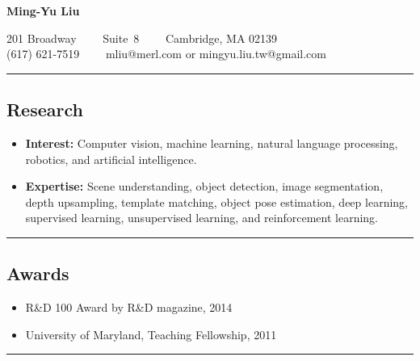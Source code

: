 \documentclass[10pt,letterpaper]{article}
\begin{document}
\begin{center}
{\LARGE \textbf{Ming-Yu Liu}}

201 Broadway\ \ \textbullet
\ \ Suite\ 8\ \ \textbullet
\ \ Cambridge, MA 02139
\\
(617) 621-7519\ \ \textbullet
\ \ mliu@merl.com or mingyu.liu.tw@gmail.com
\end{center}

\hrule
\vspace{-0.4em}
\subsection*{Research}
\begin{itemize}
\item {\bf Interest:} Computer vision, machine learning, natural language processing, robotics, and artificial intelligence.\vspace{-2mm}
\item {\bf Expertise:} Scene understanding, object detection, image segmentation, depth upsampling, template matching, object pose estimation, deep learning, supervised learning, unsupervised learning, and reinforcement learning.
\end{itemize}

\hrule
\vspace{-0.4em}
\subsection*{Awards}
\begin{itemize}
\item R\&D 100 Award by R\&D magazine, 2014\vspace{-2mm}
\item University of Maryland, Teaching Fellowship, 2011
\end{itemize}

\hrule
\vspace{-0.4em}
\end{document}
